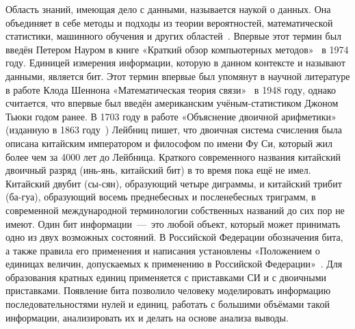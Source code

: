Область знаний, имеющая дело с данными, называется наукой о данных. Она объединяет в себе методы и подходы из теории вероятностей, математической статистики, машинного обучения и других областей~\cite{cao, holland}. Впервые этот термин был введён Петером Науром в книге «Краткий обзор компьютерных методов»~\cite{naur} в 1974 году. Единицей измерения информации, которую в данном контексте и называют данными, является бит. Этот термин впервые был упомянут в научной литературе в работе Клода Шеннона «Математическая теория связи»~\cite{shannon} в 1948 году, однако считается, что впервые был введён американским учёным-статистиком Джоном Тьюки годом ранее. В 1703 году в работе «Объяснение двоичной арифметики» (изданную в 1863 году~\cite{leibniz}) Лейбниц пишет, что двоичная система счисления была описана китайским императором и философом по имени Фу Си, который жил более чем за 4000 лет до Лейбница. Краткого современного названия китайский двоичный разряд (инь-янь, китайский бит) в то время пока ещё не имел. Китайский двубит (сы-сян), образующий четыре диграммы, и китайский трибит (ба-гуа), образующий восемь преднебесных и посленебесных триграмм, в современной международной терминологии собственных названий до сих пор не имеют. Один бит информации~---~это любой объект, который может принимать одно из двух возможных состояний. В Российской Федерации обозначения бита, а также правила его применения и написания установлены «Положением о единицах величин, допускаемых к применению в Российской Федерации»~\cite{law}. Для образования кратных единиц применяется с приставками СИ и с двоичными приставками. Появление бита позволило человеку моделировать информацию последовательностями нулей и единиц, работать с большими объёмами такой информации, анализировать их и делать на основе анализа выводы.

